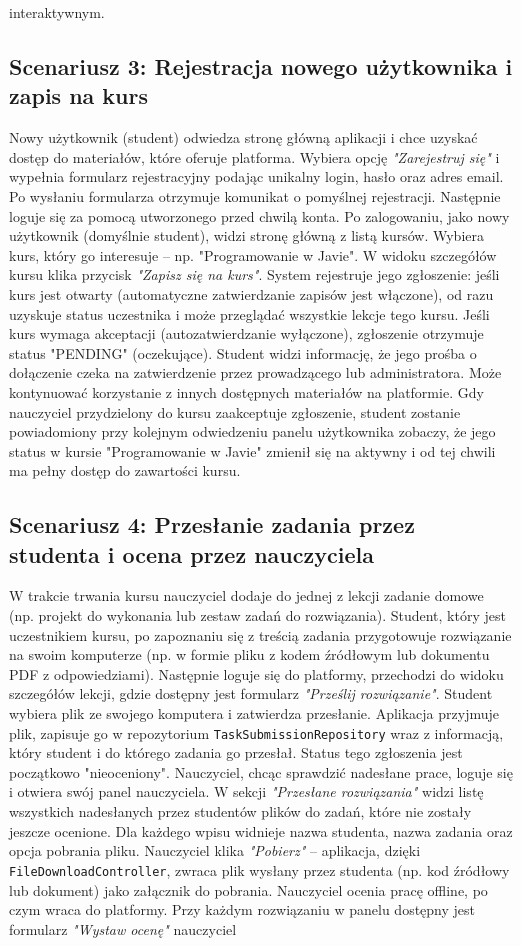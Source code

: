 \begin{itemize}
interaktywnym. \subsection{Scenariusz 3: Rejestracja nowego użytkownika i zapis na kurs} Nowy użytkownik (student) odwiedza stronę główną aplikacji i chce uzyskać dostęp do materiałów, które oferuje platforma. Wybiera opcję \textit{"Zarejestruj się"} i wypełnia formularz rejestracyjny podając unikalny login, hasło oraz adres email. Po wysłaniu formularza otrzymuje komunikat o pomyślnej rejestracji. Następnie loguje się za pomocą utworzonego przed chwilą konta. Po zalogowaniu, jako nowy użytkownik (domyślnie student), widzi stronę główną z listą kursów. Wybiera kurs, który go interesuje – np. "Programowanie w Javie". W widoku szczegółów kursu klika przycisk \textit{"Zapisz się na kurs"}. System rejestruje jego zgłoszenie: jeśli kurs jest otwarty (automatyczne zatwierdzanie zapisów jest włączone), od razu uzyskuje status uczestnika i może przeglądać wszystkie lekcje tego kursu. Jeśli kurs wymaga akceptacji (autozatwierdzanie wyłączone), zgłoszenie otrzymuje status "PENDING" (oczekujące). Student widzi informację, że jego prośba o dołączenie czeka na zatwierdzenie przez prowadzącego lub administratora. Może kontynuować korzystanie z innych dostępnych materiałów na platformie. Gdy nauczyciel przydzielony do kursu zaakceptuje zgłoszenie, student zostanie powiadomiony przy kolejnym odwiedzeniu panelu użytkownika zobaczy, że jego status w kursie "Programowanie w Javie" zmienił się na aktywny i od tej chwili ma pełny dostęp do zawartości kursu. \subsection{Scenariusz 4: Przesłanie zadania przez studenta i ocena przez nauczyciela} W trakcie trwania kursu nauczyciel dodaje do jednej z lekcji zadanie domowe (np. projekt do wykonania lub zestaw zadań do rozwiązania). Student, który jest uczestnikiem kursu, po zapoznaniu się z treścią zadania przygotowuje rozwiązanie na swoim komputerze (np. w formie pliku z kodem źródłowym lub dokumentu PDF z odpowiedziami). Następnie loguje się do platformy, przechodzi do widoku szczegółów lekcji, gdzie dostępny jest formularz \textit{"Prześlij rozwiązanie"}. Student wybiera plik ze swojego komputera i zatwierdza przesłanie. Aplikacja przyjmuje plik, zapisuje go w repozytorium \texttt{TaskSubmissionRepository} wraz z informacją, który student i do którego zadania go przesłał. Status tego zgłoszenia jest początkowo "nieoceniony". Nauczyciel, chcąc sprawdzić nadesłane prace, loguje się i otwiera swój panel nauczyciela. W sekcji \textit{"Przesłane rozwiązania"} widzi listę wszystkich nadesłanych przez studentów plików do zadań, które nie zostały jeszcze ocenione. Dla każdego wpisu widnieje nazwa studenta, nazwa zadania oraz opcja pobrania pliku. Nauczyciel klika \textit{"Pobierz"} – aplikacja, dzięki \texttt{FileDownloadController}, zwraca plik wysłany przez studenta (np. kod źródłowy lub dokument) jako załącznik do pobrania. Nauczyciel ocenia pracę offline, po czym wraca do platformy. Przy każdym rozwiązaniu w panelu dostępny jest formularz \textit{"Wystaw ocenę"} nauczyciel 
\end{itemize}
